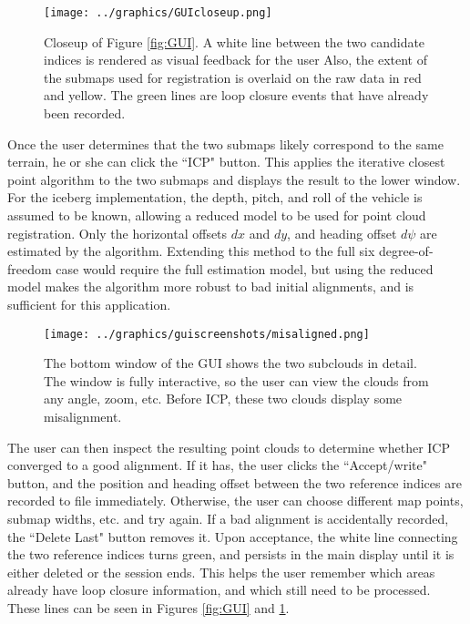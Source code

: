  \begin{figure}[htbp]
   \centering
   \texttt{[image: ../graphics/GUIcloseup.png]} %
   \caption{Closeup of Figure \ref{fig:GUI}. A white line between the two candidate indices is rendered as visual feedback for the user Also, the extent of the submaps used for registration is overlaid on the raw data in red and yellow. The green lines are loop closure events that have already been recorded.}
   \label{fig:GUIcloseup}
\end{figure}

Once the user determines that the two submaps likely correspond to the same terrain, he or she can click the ``ICP" button. This applies the iterative closest point algorithm to the two submaps and displays the result to the lower window. For the iceberg implementation, the depth, pitch, and roll of the vehicle is assumed to be known, allowing a reduced model to be used for point cloud registration. Only the horizontal offsets $dx$ and $dy$, and heading offset $d\psi$ are estimated by the algorithm. Extending this method to the full six degree-of-freedom case would require the full estimation model, but using the reduced model makes the algorithm more robust to bad initial alignments, and is sufficient for this application. 
 
 \begin{figure}[htbp]
   \centering
   \texttt{[image: ../graphics/guiscreenshots/misaligned.png]} %
   \caption{The bottom window of the GUI shows the two subclouds in detail. The window is fully interactive, so the user can view the clouds from any angle, zoom, etc. Before ICP, these two clouds display some misalignment.}
   \label{fig:GUI_preicp}
\end{figure}

The user can then inspect the resulting point clouds to determine whether ICP converged to a good alignment. If it has, the user clicks the ``Accept/write" button, and the position and heading offset between the two reference indices are recorded to file immediately. Otherwise, the user can choose different map points, submap widths, etc. and try again. If a bad alignment is accidentally recorded, the ``Delete Last" button removes it. Upon acceptance, the white line connecting the two reference indices turns green, and persists in the main display until it is either deleted or the session ends. This helps the user remember which areas already have loop closure information, and which still need to be processed. These lines can be seen in Figures \ref{fig:GUI} and \ref{fig:GUIcloseup}.

